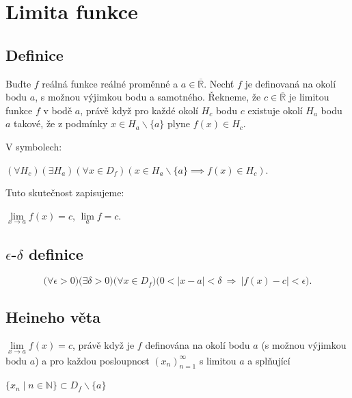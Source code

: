 \documentclass{szzclass}
\author{Daniel Hampl}
\begin{document}

\tableofcontents
\newpage

\section{Limita funkce}
\subsection{Definice}
Buďte $f$ reálná funkce reálné proměnné a 
$a \in \overline{\mathbb{R}}$. Nechť $f$ je definovaná na okolí bodu 
$a$, s možnou výjimkou bodu a samotného. Řekneme, že 
$c \in \overline{\mathbb{R}}$ je limitou funkce $f$ v bodě $a$, 
právě když pro každé okolí $H_c$ bodu $c$ existuje okolí 
$H_a$ bodu $a$ takové, že z podmínky $x \in H_a \backslash \{a\}$
plyne $f(x) \in H_c$. 

V symbolech:
\begin{center}
$(\forall H_c)(\exists H_a)(\forall x \in D_f)(x \in H_a \backslash \{a\} \implies f(x) \in H_c)$.
\end{center}


Tuto skutečnost zapisujeme:
\begin{center}
$\lim\limits_{x \rightarrow a} f(x) = c$, $\lim\limits_a f = c$.
\end{center}

\subsection{$\epsilon$-$\delta$ definice}

\begin{equation*}
\big(\forall\epsilon>0\big)\big(\exists\delta>0\big)\big( \forall x \in D_f)( 0 < |x - a| < \delta \ \Rightarrow \ |f(x) - c| < \epsilon\big).\end{equation*}

\subsection{Heineho věta}
$\lim\limits_{x \rightarrow a} f(x) = c$, právě když je $f$ definována
na okolí bodu $a$ (s možnou výjimkou bodu $a$) a pro každou posloupnost 
$(x_n)_{n=1}^\infty$ s limitou $a$ a splňující

\begin{center}
    $\{x_n \mid n\in\mathbb{N}\} \subset D_f \backslash \{a\}$
\end{center}
  
\end{document}
